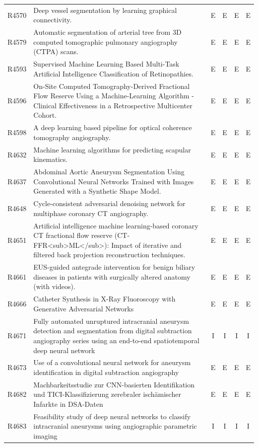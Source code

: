 \begin{longtable}{@{}l p{8.6cm} c c c c@{}}
R4570 & Deep vessel segmentation by learning graphical connectivity. & E & E & E & E \\
R4579 & Automatic segmentation of arterial tree from 3D computed tomographic pulmonary angiography (CTPA) scans. & E & E & E & E \\
R4593 & Supervised Machine Learning Based Multi-Task Artificial Intelligence Classification of Retinopathies. & E & E & E & E \\
R4596 & On-Site Computed Tomography-Derived Fractional Flow Reserve Using a Machine-Learning Algorithm - Clinical Effectiveness in a Retrospective Multicenter Cohort. & E & E & E & E \\
R4598 & A deep learning based pipeline for optical coherence tomography angiography. & E & E & E & E \\
R4632 & Machine learning algorithms for predicting scapular kinematics. & E & E & E & E \\
R4637 & Abdominal Aortic Aneurysm Segmentation Using Convolutional Neural Networks Trained with Images Generated with a Synthetic Shape Model. & E & E & E & E \\
R4648 & Cycle-consistent adversarial denoising network for multiphase coronary CT angiography. & E & E & E & E \\
R4651 & Artificial intelligence machine learning-based coronary CT fractional flow reserve (CT-FFR<sub>ML</sub>): Impact of iterative and filtered back projection reconstruction techniques. & E & E & E & E \\
R4661 & EUS-guided antegrade intervention for benign biliary diseases in patients with surgically altered anatomy (with videos). & E & E & E & E \\
R4666 & Catheter Synthesis in X-Ray Fluoroscopy with Generative Adversarial Networks & E & E & E & E \\
R4671 & Fully automated unruptured intracranial aneurysm detection and segmentation from digital subtraction angiography series using an end-to-end spatiotemporal deep neural network & I & I & I & I \\
R4673 & Use of a convolutional neural network for aneurysm identification in digital subtraction angiography & E & E & E & E \\
R4682 & Machbarkeitsstudie zur CNN-basierten Identifikation und TICI-Klassifizierung zerebraler ischämischer Infarkte in DSA-Daten & E & E & E & E \\
R4683 & Feasibility study of deep neural networks to classify intracranial aneurysms using angiographic parametric imaging & I & I & I & I \\

\end{longtable}
